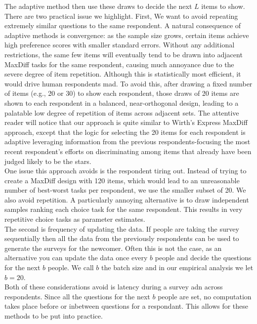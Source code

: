 \documentclass[nonblindrev]{informs3}
\begin{document}
The adaptive method then use these draws to decide the next $L$ items to show.\\
There are two practical issue we highlight.
First, We want to avoid repeating extremely similar questions to the same respondent. A natural consequence of adaptive methods is convergence: as the sample size grows, certain items achieve high preference scores with smaller standard errors.  Without any additional restrictions, the same few items will eventually tend to be drawn into adjacent MaxDiff tasks for the same respondent, causing much annoyance due to the severe degree of item repetition.  Although this is statistically most efficient, it would drive human respondents mad.  To avoid this, after drawing a fixed number of items (e.g., 20 or 30) to show each respondent,  those draws of 20 items are shown to each respondent in a balanced, near-orthogonal design, leading to a palatable low degree of repetition of items across adjacent sets.  The attentive reader will notice that our approach is quite similar to Wirth's Express MaxDiff approach, except that the logic for selecting the 20 items for each respondent is adaptive leveraging information from the previous respondents-focusing the most recent respondent's efforts on discriminating among items that already have been judged likely to be the stars.\\
One issue this approach avoids is the respondent tiring out. Instead of trying to create a MaxDiff design with 120 items, which would lead to an unreasonable number of best-worst tasks per respondent, we use the smaller subset of 20.  We also avoid repetition. A particularly annoying alternative is to draw independent samples ranking each choice task for the same respondent. This results in very repetitive choice tasks as parameter estimates.  \\
The second is frequency of updating the data. If people are taking the survey sequentially then all the data from the previously respondents can be used to generate the surveys for the newcomer. Often this is not the case, as an alternative you can update the data once every $b$ people and decide the questions for the next $b$ people. We call $b$ the batch size and in our empirical analysis we let $b=20$.\\
Both of these considerations avoid is latency during a survey adn across respondents. Since all the questions for the next $b$ people are set, no computation takes place before or inbetween questions for a respondant. This allows for these methods to be put into practice.
\end{document}
